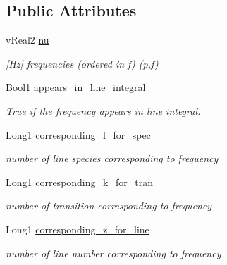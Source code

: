 \subsection*{Public Attributes}
\begin{DoxyCompactItemize}
\item 
\mbox{\label{structFrequencies_a330ed1d451b153a42191946acaee4ee0}} 
v\+Real2 \mbox{\hyperlink{structFrequencies_a330ed1d451b153a42191946acaee4ee0}{nu}}
\begin{DoxyCompactList}\small\item\em \mbox{[}Hz\mbox{]} frequencies (ordered in f) (p,f) \end{DoxyCompactList}\item 
\mbox{\label{structFrequencies_a643386df8be2d8edd40715fedfa4d061}} 
Bool1 \mbox{\hyperlink{structFrequencies_a643386df8be2d8edd40715fedfa4d061}{appears\+\_\+in\+\_\+line\+\_\+integral}}
\begin{DoxyCompactList}\small\item\em True if the frequency appears in line integral. \end{DoxyCompactList}\item 
\mbox{\label{structFrequencies_ac9b5a2b360373bd05660eff98ecd7774}} 
Long1 \mbox{\hyperlink{structFrequencies_ac9b5a2b360373bd05660eff98ecd7774}{corresponding\+\_\+l\+\_\+for\+\_\+spec}}
\begin{DoxyCompactList}\small\item\em number of line species corresponding to frequency \end{DoxyCompactList}\item 
\mbox{\label{structFrequencies_a34d7c5644fd7312eb41f8fc8680d74f6}} 
Long1 \mbox{\hyperlink{structFrequencies_a34d7c5644fd7312eb41f8fc8680d74f6}{corresponding\+\_\+k\+\_\+for\+\_\+tran}}
\begin{DoxyCompactList}\small\item\em number of transition corresponding to frequency \end{DoxyCompactList}\item 
\mbox{\label{structFrequencies_abf3f81ef858d0662098fb1aa2c61d1fa}} 
Long1 \mbox{\hyperlink{structFrequencies_abf3f81ef858d0662098fb1aa2c61d1fa}{corresponding\+\_\+z\+\_\+for\+\_\+line}}
\begin{DoxyCompactList}\small\item\em number of line number corresponding to frequency \end{DoxyCompactList}\end{DoxyCompactItemize}


